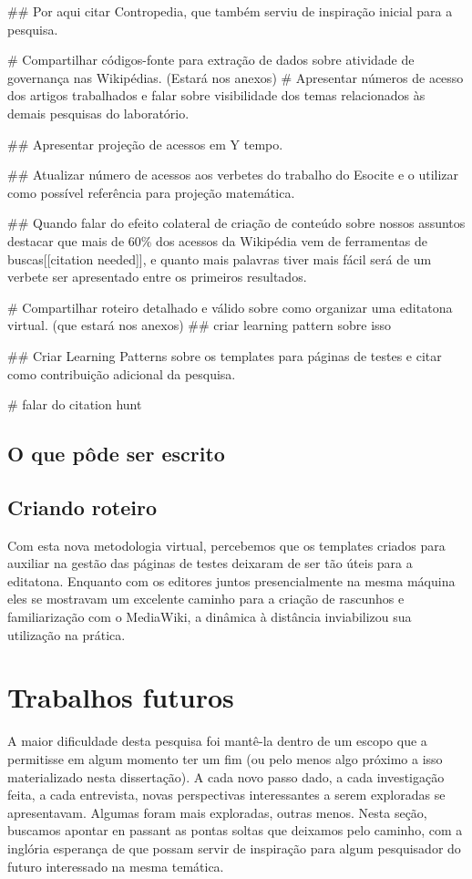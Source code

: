 ## Por aqui citar Contropedia, que também serviu de inspiração inicial para a pesquisa.

# Compartilhar códigos-fonte para extração de dados sobre atividade de governança nas Wikipédias. (Estará nos anexos)
# Apresentar números de acesso dos artigos trabalhados e falar sobre visibilidade dos temas relacionados às demais pesquisas do laboratório.

## Apresentar projeção de acessos em Y tempo.

## Atualizar número de acessos aos verbetes do trabalho do Esocite e o utilizar como possível referência para projeção matemática.

## Quando falar do efeito colateral de criação de conteúdo sobre nossos assuntos destacar que mais de 60\% dos acessos da Wikipédia vem de ferramentas de buscas[[citation needed]], e quanto mais palavras tiver mais fácil será de um verbete ser apresentado entre os primeiros resultados.

# Compartilhar roteiro detalhado e válido sobre como organizar uma editatona virtual. (que estará nos anexos) ## criar learning pattern sobre isso

## Criar Learning Patterns sobre os templates para páginas de testes e citar como contribuição adicional da pesquisa.

# falar do citation hunt


\subsection{O que pôde ser escrito}


\subsection{Criando roteiro}

Com esta nova metodologia virtual, percebemos que os templates criados para auxiliar na gestão das páginas de testes deixaram de ser tão úteis para a editatona. Enquanto com os editores juntos presencialmente na mesma máquina eles se mostravam um excelente caminho para a criação de rascunhos e familiarização com o MediaWiki, a dinâmica à distância inviabilizou sua utilização na prática.


\section{Trabalhos futuros}

A maior dificuldade desta pesquisa foi mantê-la dentro de um escopo que a permitisse em algum momento ter um fim (ou pelo menos algo próximo a isso materializado nesta dissertação). A cada novo passo dado, a cada investigação feita, a cada entrevista, novas perspectivas interessantes a serem exploradas se apresentavam. Algumas foram mais exploradas, outras menos. Nesta seção, buscamos apontar en passant as pontas soltas que deixamos pelo caminho, com a inglória esperança de que possam servir de inspiração para algum pesquisador do futuro interessado na mesma temática.


